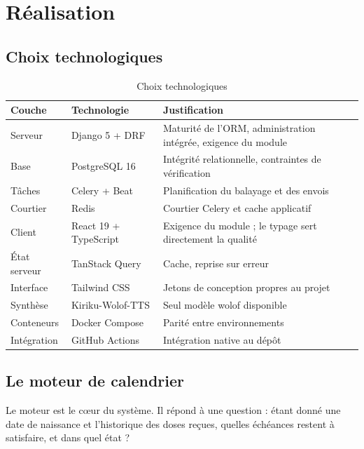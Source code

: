 \documentclass[11pt,a4paper]{report}
\begin{document}
\chapter{Réalisation}

\section{Choix technologiques}

\begin{table}[H]
\centering
\begin{tabularx}{\textwidth}{@{}llX@{}}
\toprule
\textbf{Couche} & \textbf{Technologie} & \textbf{Justification} \\
\midrule
Serveur & Django 5 + DRF & Maturité de l'ORM, administration intégrée,
exigence du module \\
Base & PostgreSQL 16 & Intégrité relationnelle, contraintes de vérification \\
Tâches & Celery + Beat & Planification du balayage et des envois \\
Courtier & Redis & Courtier Celery et cache applicatif \\
Client & React 19 + TypeScript & Exigence du module ; le typage sert
directement la qualité \\
État serveur & TanStack Query & Cache, reprise sur erreur \\
Interface & Tailwind CSS & Jetons de conception propres au projet \\
Synthèse & Kiriku-Wolof-TTS & Seul modèle wolof disponible \\
Conteneurs & Docker Compose & Parité entre environnements \\
Intégration & GitHub Actions & Intégration native au dépôt \\
\bottomrule
\end{tabularx}
\caption{Choix technologiques}
\end{table}

\section{Le moteur de calendrier}

Le moteur est le cœur du système. Il répond à une question : étant donné une
date de naissance et l'historique des doses reçues, quelles échéances
restent à satisfaire, et dans quel état ?
\end{document}
